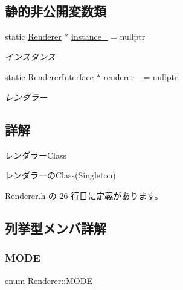 \subsection*{静的非公開変数類}
\begin{DoxyCompactItemize}
\item 
static \mbox{\hyperlink{class_renderer}{Renderer}} $\ast$ \mbox{\hyperlink{class_renderer_aa0ca48ac8408e8726d5dd135432ae4fa}{instance\+\_\+}} = nullptr
\begin{DoxyCompactList}\small\item\em インスタンス \end{DoxyCompactList}\item 
static \mbox{\hyperlink{class_renderer_interface}{Renderer\+Interface}} $\ast$ \mbox{\hyperlink{class_renderer_a64d00cd885d84ff355228d884c0215dc}{renderer\+\_\+}} = nullptr
\begin{DoxyCompactList}\small\item\em レンダラー \end{DoxyCompactList}\end{DoxyCompactItemize}


\subsection{詳解}
レンダラー\+Class 

レンダラーの\+Class(\+Singleton) 

 Renderer.\+h の 26 行目に定義があります。



\subsection{列挙型メンバ詳解}
\mbox{\label{class_renderer_ab5a9379ccadcf2b3394c61cf8c835fec}} 
\subsubsection{\texorpdfstring{M\+O\+DE}{MODE}}
{\footnotesize\ttfamily enum \mbox{\hyperlink{class_renderer_ab5a9379ccadcf2b3394c61cf8c835fec}{Renderer\+::\+M\+O\+DE}}}

